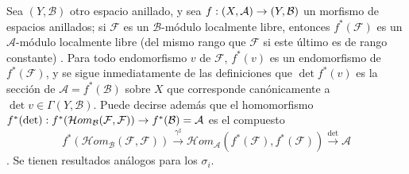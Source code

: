 \documentclass[oneside,10pt]{amsart}
\makeatletter
\newcommand{\ega@arrow}[2]{\mathchoice{#1}{#2}{#2}{#2}}
\renewcommand{\to}{\ega@arrow{\longrightarrow}{\rightarrow}}
\makeatother
\begin{document}
\begin{env}[6.4.8]
Sea $(Y,\mathcal{B})$ otro espacio anillado, y sea $f:(X,\mathcal{A})\to(Y,\mathcal{B})$ un morfismo de espacios anillados;
si $\mathcal{F}$ es un $\mathcal{B}$-módulo localmente libre, entonces $f^*(\mathcal{F})$ es un $\mathcal{A}$-módulo localmente libre (del mismo rango que $\mathcal{F}$ si este último es de rango constante) .
Para todo endomorfismo $v$ de $\mathcal{F}$, $f^*(v)$ es un endomorfismo de $f^*(\mathcal{F})$, y se sigue inmediatamente de las definiciones que $\det f^*(v)$ es la sección de $\mathcal{A}=f^*(\mathcal{B})$ sobre $X$ que corresponde canónicamente a $\det v\in\Gamma(Y,\mathcal{B})$.
Puede decirse además que el homomorfismo $f^*(\det):f^*(\mathcal{H}om_{\mathcal{B}}(\mathcal{F},\mathcal{F}))
\to f^*(\mathcal{B})=\mathcal{A}$ es el compuesto
\[
f^*(\mathcal{H}om_{\mathcal{B}}(\mathcal{F},\mathcal{F}))
\xrightarrow{\gamma^\sharp}
\mathcal{H}om_{\mathcal{A}}(f^*(\mathcal{F}),f^*(\mathcal{F}))
\xrightarrow{\det}\mathcal{A}
\]
.
Se tienen resultados análogos para los $\sigma_i$.
\end{env}
\end{document}
